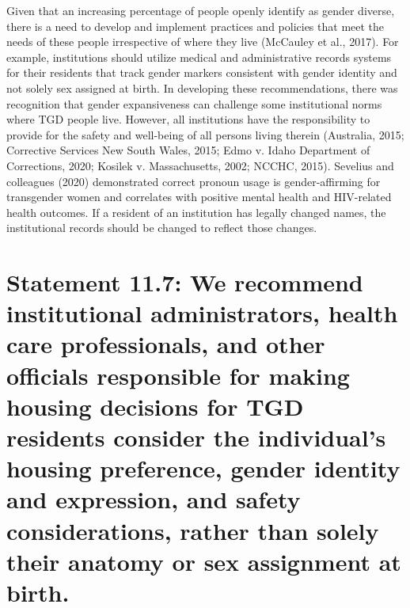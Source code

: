 \documentclass[
]{book}
\begin{document}
Given that an increasing percentage of people
openly identify as gender diverse, there is a need
to develop and implement practices and policies
that meet the needs of these people irrespective
of where they live (McCauley et al., 2017). For
example, institutions should utilize medical and
administrative records systems for their residents
that track gender markers consistent with gender
identity and not solely sex assigned at birth. In
developing these recommendations, there was
recognition that gender expansiveness can challenge some institutional norms where TGD people live. However, all institutions have the
responsibility to provide for the safety and
well-being of all persons living therein (Australia,
2015; Corrective Services New South Wales, 2015;
Edmo v. Idaho Department of Corrections, 2020;
Kosilek v. Massachusetts, 2002; NCCHC, 2015).
Sevelius and colleagues (2020) demonstrated correct pronoun usage is gender-affirming for
transgender women and correlates with positive
mental health and HIV-related health outcomes.
If a resident of an institution has legally changed
names, the institutional records should be changed
to reflect those changes.

\hypertarget{statement-11.7-we-recommend-institutional-administrators-health-care-professionals-and-other-officials-responsible-for-making-housing-decisions-for-tgd-residents-consider-the-individuals-housing-preference-gender-identity-and-expression-and-safety-considerations-rather-than-solely-their-anatomy-or-sex-assignment-at-birth.}{%
\section*{Statement 11.7: We recommend institutional administrators, health care professionals, and other officials responsible for making housing decisions for TGD residents consider the individual's housing preference, gender identity and expression, and safety considerations, rather than solely their anatomy or sex assignment at birth.}\label{statement-11.7-we-recommend-institutional-administrators-health-care-professionals-and-other-officials-responsible-for-making-housing-decisions-for-tgd-residents-consider-the-individuals-housing-preference-gender-identity-and-expression-and-safety-considerations-rather-than-solely-their-anatomy-or-sex-assignment-at-birth.}}
\end{document}
